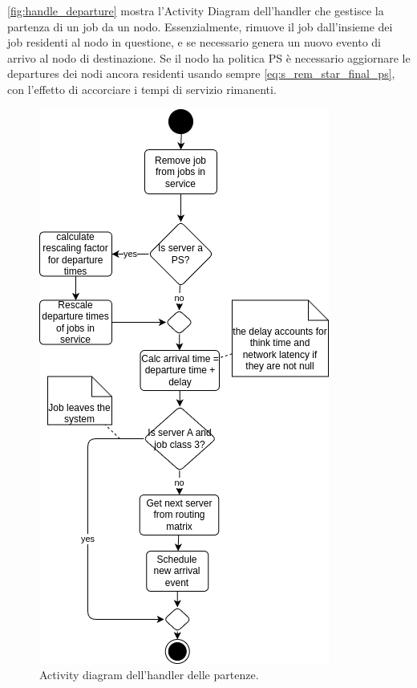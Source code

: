 \autoref{fig:handle_departure} mostra l'Activity Diagram dell'handler che gestisce la partenza di un job da un nodo. Essenzialmente, rimuove il job dall'insieme dei job residenti al nodo in questione, e se necessario genera un nuovo evento di arrivo al nodo di destinazione. Se il nodo ha politica PS è necessario aggiornare le departures dei nodi ancora residenti usando sempre \autoref{eq:s_rem_star_final_ps}, con l'effetto di accorciare i tempi di servizio rimanenti.

\begin{figure}
    \centering
    \includegraphics[width=1\linewidth]{figs/diagrams/handle_departure.drawio.png}
    \caption{Activity diagram dell'handler delle partenze.}
    \label{fig:handle_departure}
\end{figure}

